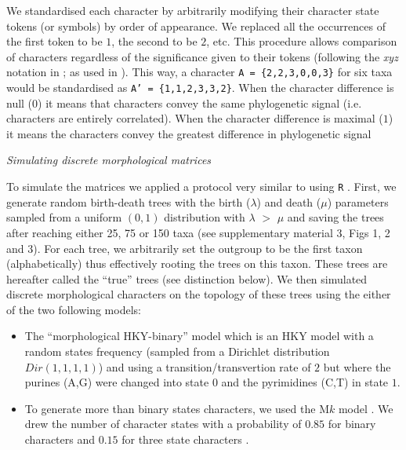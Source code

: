 \documentclass[12pt,letterpaper]{article}
\renewcommand{\subsection}[1]{%
\bigskip
\begin{center}
\begin{large}
\normalfont\itshape #1
\end{large}
\end{center}}
\begin{document}
We standardised each character by arbitrarily modifying their character state tokens (or symbols) by order of appearance.
We replaced all the occurrences of the first token to be $1$, the second to be $2$, etc.
This procedure allows comparison of characters regardless of the significance given to their tokens (following the \textit{xyz} notation in \citealt{felsenstein2004inferring}; as used in \citealt{Davalos01072014}).
This way, a character \texttt{A = \{2,2,3,0,0,3\}} for six taxa would be standardised as \texttt{A' = \{1,1,2,3,3,2\}}.
When the character difference is null ($0$) it means that characters convey the same phylogenetic signal (i.e. characters are entirely correlated). 
When the character difference is maximal ($1$) it means the characters convey the greatest difference in phylogenetic signal

\subsection{Simulating discrete morphological matrices}
To simulate the matrices we applied a protocol very similar to \cite{Guillerme2016146} using \texttt{R} \citep{R}.
First, we generate random birth-death trees with the birth ($\lambda$) and death ($\mu$) parameters sampled from a uniform $(0,1)$ distribution with $\lambda$ $>$ $\mu$\citep[\texttt{diversitree} v0.9-8;][]{fitzjohndiversitree2012} and saving the trees after reaching either 25, 75 or 150 taxa (see supplementary material 3, Figs 1, 2 and 3).
For each tree, we arbitrarily set the outgroup to be the first taxon (alphabetically) thus effectively rooting the trees on this taxon.
These trees are hereafter called the ``true'' trees (see distinction below).
We then simulated discrete morphological characters on the topology of these trees using the either of the two following models:
\begin{itemize}
    \item The ``morphological HKY-binary'' model \citep{OReilly20160081} which is an HKY model \citep{HKY85} with a random states frequency (sampled from a Dirichlet distribution $Dir(1,1,1,1)$) and using a transition/transvertion rate of $2$ \citep{douadycomparison2003} but where the purines (A,G) were changed into state $0$ and the pyrimidines (C,T) in state $1$.
    \item To generate more than binary states characters, we used the M$k$ model \citep{lewisa2001}.
    We drew the number of character states with a probability of $0.85$ for binary characters and $0.15$ for three state characters \citep{Guillerme2016146,ZouConvergence}.
\end{itemize}
\end{document}
